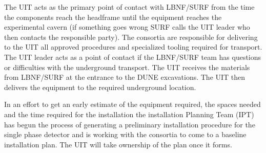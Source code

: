The UIT acts as the primary point of contact with LBNF/SURF from the
time the components reach the headframe until the equipment reaches
the experimental cavern (if something goes wrong SURF calls the UIT
leader who then contacts the responsible party). The consortia are
responsible for delivering to the UIT all approved procedures and
specialized tooling required for transport. The UIT leader acts as a
point of contact if the LBNF/SURF team has questions or difficulties
with the underground transport.  The UIT receives the materials from
LBNF/SURF at the entrance to the DUNE excavations. The UIT then
delivers the equipment to the required underground location.

In an effort to get an early estimate of the equipment required, the
spaces needed and the time required for the installation the
installation Planning Team (IPT) has begun the process of generating a
preliminary installation procedure for the single phase detector and is working with the consortia to
come to a baseline installation plan. The UIT will take ownership of
the plan once it forms.
